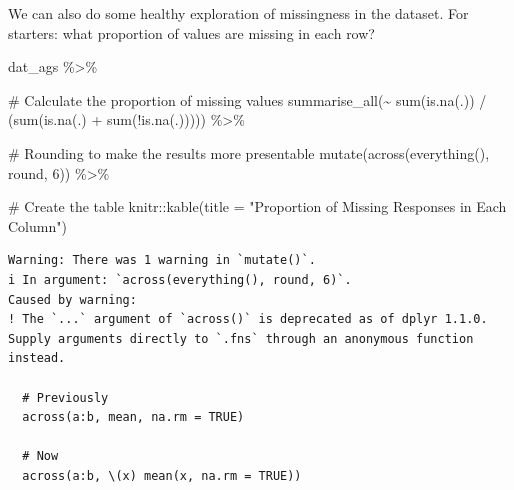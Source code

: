 \documentclass[
  letterpaper,
  DIV=11,
  numbers=noendperiod]{scrreprt}
\newenvironment{Shaded}{\begin{snugshade}}{\end{snugshade}}
\newcommand{\AttributeTok}[1]{\textcolor[rgb]{0.40,0.45,0.13}{#1}}
\newcommand{\CommentTok}[1]{\textcolor[rgb]{0.37,0.37,0.37}{#1}}
\newcommand{\DecValTok}[1]{\textcolor[rgb]{0.68,0.00,0.00}{#1}}
\newcommand{\FunctionTok}[1]{\textcolor[rgb]{0.28,0.35,0.67}{#1}}
\newcommand{\NormalTok}[1]{\textcolor[rgb]{0.00,0.23,0.31}{#1}}
\newcommand{\SpecialCharTok}[1]{\textcolor[rgb]{0.37,0.37,0.37}{#1}}
\newcommand{\StringTok}[1]{\textcolor[rgb]{0.13,0.47,0.30}{#1}}
\begin{document}
We can also do some healthy exploration of missingness in the dataset.
For starters: what proportion of values are missing in each row?

\begin{Shaded}
\begin{Highlighting}[]
\NormalTok{dat\_ags }\SpecialCharTok{\%\textgreater{}\%} 
  
  \CommentTok{\# Calculate the proportion of missing values }
  \FunctionTok{summarise\_all}\NormalTok{(}\SpecialCharTok{\textasciitilde{}} \FunctionTok{sum}\NormalTok{(}\FunctionTok{is.na}\NormalTok{(.)) }\SpecialCharTok{/}\NormalTok{ (}\FunctionTok{sum}\NormalTok{(}\FunctionTok{is.na}\NormalTok{(.) }\SpecialCharTok{+} \FunctionTok{sum}\NormalTok{(}\SpecialCharTok{!}\FunctionTok{is.na}\NormalTok{(.))))) }\SpecialCharTok{\%\textgreater{}\%} 
  
  \CommentTok{\# Rounding to make the results more presentable}
  \FunctionTok{mutate}\NormalTok{(}\FunctionTok{across}\NormalTok{(}\FunctionTok{everything}\NormalTok{(), round, }\DecValTok{6}\NormalTok{)) }\SpecialCharTok{\%\textgreater{}\%} 
  
  \CommentTok{\# Create the table}
\NormalTok{  knitr}\SpecialCharTok{::}\FunctionTok{kable}\NormalTok{(}\AttributeTok{title =} \StringTok{"Proportion of Missing Responses in Each Column"}\NormalTok{) }
\end{Highlighting}
\end{Shaded}

\begin{verbatim}
Warning: There was 1 warning in `mutate()`.
i In argument: `across(everything(), round, 6)`.
Caused by warning:
! The `...` argument of `across()` is deprecated as of dplyr 1.1.0.
Supply arguments directly to `.fns` through an anonymous function instead.

  # Previously
  across(a:b, mean, na.rm = TRUE)

  # Now
  across(a:b, \(x) mean(x, na.rm = TRUE))
\end{verbatim}
\end{document}
